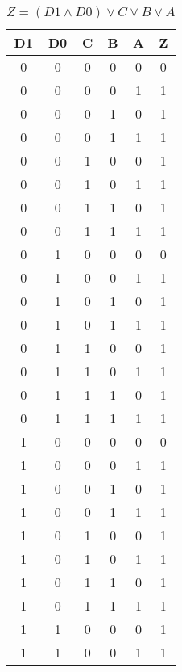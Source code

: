 \begin{center}
    \begin{table}[h] \caption{\(Z = (D1 \land D0) \lor C \lor B \lor A \)}
        \begin{center}
            \begin{tabular}{|c|c|c|c|c||c|} \hline
            D1 & D0 & C & B & A & Z \\ \hline\hline
            0  & 0  & 0 & 0 & 0 & 0 \\ \hline
            0  & 0  & 0 & 0 & 1 & 1 \\ \hline
            0  & 0  & 0 & 1 & 0 & 1 \\ \hline
            0  & 0  & 0 & 1 & 1 & 1 \\ \hline
            0  & 0  & 1 & 0 & 0 & 1 \\ \hline
            0  & 0  & 1 & 0 & 1 & 1 \\ \hline
            0  & 0  & 1 & 1 & 0 & 1 \\ \hline
            0  & 0  & 1 & 1 & 1 & 1 \\ \hline
            0  & 1  & 0 & 0 & 0 & 0 \\ \hline
            0  & 1  & 0 & 0 & 1 & 1 \\ \hline
            0  & 1  & 0 & 1 & 0 & 1 \\ \hline
            0  & 1  & 0 & 1 & 1 & 1 \\ \hline
            0  & 1  & 1 & 0 & 0 & 1 \\ \hline
            0  & 1  & 1 & 0 & 1 & 1 \\ \hline
            0  & 1  & 1 & 1 & 0 & 1 \\ \hline
            0  & 1  & 1 & 1 & 1 & 1 \\ \hline
            1  & 0  & 0 & 0 & 0 & 0 \\ \hline
            1  & 0  & 0 & 0 & 1 & 1 \\ \hline
            1  & 0  & 0 & 1 & 0 & 1 \\ \hline
            1  & 0  & 0 & 1 & 1 & 1 \\ \hline
            1  & 0  & 1 & 0 & 0 & 1 \\ \hline
            1  & 0  & 1 & 0 & 1 & 1 \\ \hline
            1  & 0  & 1 & 1 & 0 & 1 \\ \hline
            1  & 0  & 1 & 1 & 1 & 1 \\ \hline
            1  & 1  & 0 & 0 & 0 & 1 \\ \hline
            1  & 1  & 0 & 0 & 1 & 1 \\ \hline

\end{tabular}
\end{center}
\end{table}
\end{center}
